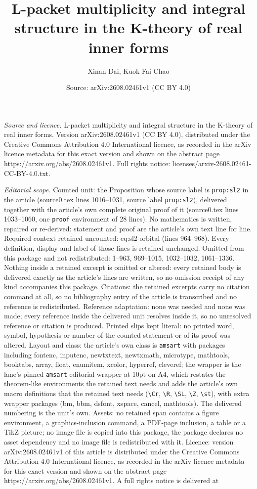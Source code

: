 \documentclass[10pt,a4paper]{amsart}
\title[L-packet multiplicity and integral structure in the K-theory]{L-packet multiplicity and integral structure in the K-theory of real inner forms}
\author{Xinan Dai, Kuok Fai Chao}
\date{Source: arXiv:2608.02461v1 (CC BY 4.0)}
\begin{document}
\maketitle

\noindent\emph{Source and licence.} L-packet multiplicity and integral structure in the K-theory of real inner forms. Version arXiv:2608.02461v1 (CC BY 4.0), distributed under the Creative Commons Attribution 4.0 International licence, as recorded in the arXiv licence metadata for this exact version and shown on the abstract page https://arxiv.org/abs/2608.02461v1. Full rights notice: licenses/arxiv-2608.02461-CC-BY-4.0.txt.\par\smallskip

\noindent\textit{Editorial scope.} Counted unit: the Proposition whose source label is \texttt{prop:sl2} in the article (source0.tex lines 1016--1031, source label \texttt{prop:sl2}), delivered together with the article's own complete original proof of it (source0.tex lines 1033--1060, one \texttt{proof} environment of 28 lines). No mathematics is written, repaired or re-derived: statement and proof are the article's own text line for line. Required context retained uncounted: eq:sl2-orbital (lines 964--968). Every definition, display and label of those lines is retained unchanged. Omitted from this package and not redistributed: 1--963, 969--1015, 1032--1032, 1061--1336. Nothing inside a retained excerpt is omitted or altered: every retained body is delivered exactly as the article's lines are written, so no omission receipt of any kind accompanies this package. Citations: the retained excerpts carry no citation command at all, so no bibliography entry of the article is transcribed and no reference is redistributed. Reference adaptation: none was needed and none was made; every reference inside the delivered unit resolves inside it, so no unresolved reference or citation is produced. Printed slips kept literal: no printed word, symbol, hypothesis or number of the counted statement or of its proof was altered. Layout and class: the article's own class is \texttt{amsart} with packages including fontenc, inputenc, newtxtext, newtxmath, microtype, mathtools, booktabs, array, float, enumitem, xcolor, hyperref, cleveref; the wrapper is the lane's pinned \texttt{amsart} editorial wrapper at 10pt on A4, which restates the theorem-like environments the retained text needs and adds the article's own macro definitions that the retained text needs (\texttt{\textbackslash Cr}, \texttt{\textbackslash R}, \texttt{\textbackslash SL}, \texttt{\textbackslash Z}, \texttt{\textbackslash st}), with extra wrapper packages (bm, bbm, dsfont, xspace, cancel, mathtools). The delivered numbering is the unit's own. Assets: no retained span contains a figure environment, a graphics-inclusion command, a PDF-page inclusion, a table or a TikZ picture; no image file is copied into this package, the package declares no asset dependency and no image file is redistributed with it. Licence: version arXiv:2608.02461v1 of this article is distributed under the Creative Commons Attribution 4.0 International licence, as recorded in the arXiv licence metadata for this exact version and shown on the abstract page https://arxiv.org/abs/2608.02461v1. A full rights notice is delivered at 
\end{document}
